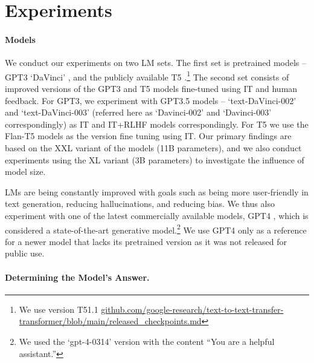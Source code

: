 \section{Experiments}


\paragraph{Models}
We conduct our experiments on two LM sets.
The first set is  pretrained models -- GPT3 `DaVinci' \cite{NEURIPS2020_1457c0d6},  and the publicly available T5 \cite{raffel2020exploring}.\footnote{We use version T51.1  \url{github.com/google-research/text-to-text-transfer-transformer/blob/main/released_checkpoints.md}}
The second set consists of improved versions of the GPT3 and T5 models fine-tuned using IT and human feedback.
For GPT3, we experiment with GPT3.5 models -- `text-DaVinci-002'  and `text-DaVinci-003' (referred here as `Davinci-002' and `Davinci-003' correspondingly) \cite{Ouyang2022TrainingLM} as IT and IT+RLHF models correspondingly.
For T5 we use the Flan-T5 \cite{chung2022scaling} models as the version fine tuning using IT.
Our primary findings are based on the XXL variant of the models (11B parameters), and we also conduct experiments using the XL variant (3B parameters) to investigate the influence of model size.

LMs are being constantly improved with goals such as being more user-friendly in text generation, reducing hallucinations, and reducing bias.
We thus also experiment with one of the latest commercially available models, GPT4  \cite{2303.08774}, which is considered a state-of-the-art generative model.\footnote{We used the `gpt-4-0314' version with the content ``You are a helpful assistant.''}
We use GPT4 only as a reference for a newer model that lacks its pretrained version as it was not released for public use.


\paragraph{Determining the Model's Answer.}
\label{subsec:eval_ans}

